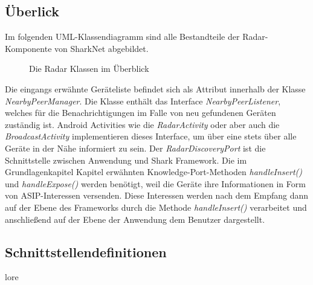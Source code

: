 \subsection{Überlick}\label{ch:radaroverview}
Im folgenden UML-Klassendiagramm sind alle Bestandteile der Radar-Komponente von SharkNet abgebildet.
\begin{figure}[H]
	\centering
	\hspace*{1cm}
	\caption{Die Radar Klassen im Überblick}
	\label{fig:radarhAll}
\end{figure}
Die eingangs erwähnte Geräteliste befindet sich als Attribut innerhalb der Klasse \textit{NearbyPeerManager}. Die Klasse enthält das Interface \textit{NearbyPeerListener}, welches für die Benachrichtigungen im Falle von neu gefundenen Geräten zuständig ist. Android Activities wie die \textit{RadarActivity} oder aber auch die \textit{BroadcastActivity} implementieren dieses Interface, um über eine stets über alle Geräte in der Nähe informiert zu sein. Der \textit{RadarDiscoveryPort} ist die Schnittstelle zwischen Anwendung und Shark Framework. Die im Grundlagenkapitel Kapitel erwähnten Knowledge-Port-Methoden \textit{handleInsert()} und \textit{handleExpose()} werden benötigt, weil die Geräte ihre Informationen in Form von ASIP-Interessen versenden. Diese Interessen werden nach dem Empfang dann auf der Ebene des Frameworks durch die Methode \textit{handleInsert()} verarbeitet und anschließend auf der Ebene der Anwendung dem Benutzer dargestellt.

\subsection{Schnittstellendefinitionen}\label{ch:radarinterfaces}
lore

